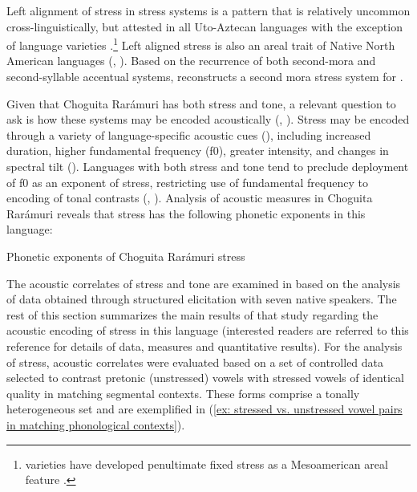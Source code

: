 Left alignment of stress in stress systems is a pattern that is relatively uncommon cross-linguistically, but attested in all {Uto-Aztecan} languages with the exception of  language varieties \parencite{munro1977towards}.\footnote{ varieties have developed penultimate fixed stress as a Mesoamerican areal feature \citep{munro1977towards}.} Left aligned stress is also an areal trait of Native North American languages (\citealt{rice2010accent}, \citealt{caballero2020oxford}). Based on the recurrence of both second-mora and second-syllable accentual systems, \citet{munro1977towards} reconstructs a second mora stress system for .

Given that Choguita Rarámuri has both stress and tone, a relevant question to ask is how these systems may be encoded acoustically (\citealt{remijsen2002lexically}, \citealt{remijsen2005stress}). Stress may be encoded through a variety of language-specific acoustic cues (\citealt{gordonvanderhulst2018stress}), including increased duration, higher fundamental frequency (f0), greater intensity, and changes in spectral tilt (\citealt{roettger2017methodological}). Languages with both stress and tone tend to preclude deployment of f0 as an exponent of stress, restricting use of fundamental frequency to encoding of tonal contrasts (\citealt{remijsen2005stress}, \citealt{guion2010word}). Analysis of acoustic measures in Choguita Rarámuri reveals that stress has the following phonetic exponents in this language:

\ea\label{ex: Phonetic exponents of Choguita Rarámuri stress}
{Phonetic exponents of Choguita Rarámuri stress}

    \z
\z

The acoustic correlates of stress and tone are examined in \citet{caballero2015tone} based on the analysis of data obtained through structured elicitation with seven native speakers. The rest of this section summarizes the main results of that study regarding the acoustic encoding of stress in this language (interested readers are referred to this reference for details of data, measures and quantitative results). For the analysis of stress, acoustic correlates were evaluated based on a set of controlled data selected to contrast pretonic (unstressed) vowels with stressed vowels of identical quality in matching segmental contexts. These forms comprise a tonally heterogeneous set and are exemplified in (\ref{ex: stressed vs. unstressed vowel pairs in matching phonological contexts}).

